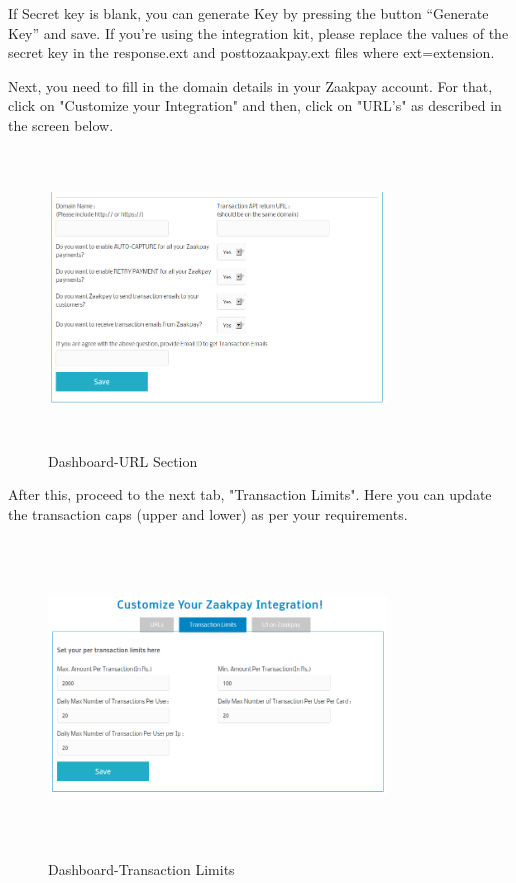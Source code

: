 \documentclass{article}
\begin{document}
If Secret key is blank, you can generate Key by pressing the button “Generate Key” and save. If you're using the integration kit, please replace the values of the secret key in the response.ext and posttozaakpay.ext files where ext=extension.

Next, you need to fill in the domain details in your Zaakpay account. For that, click on "Customize your Integration" and then, click on "URL's" as described in the screen below.

\begin{figure}[H]
\centering
\caption{Dashboard-URL Section}
\includegraphics[width=0.8\textwidth,height=3.1in]{Data_not_complete.png}
\end{figure}

After this, proceed to the next tab, "Transaction Limits". Here you can update the transaction caps (upper and lower) as per your requirements.

\begin{figure}[H]
\centering
\caption{Dashboard-Transaction Limits}
\includegraphics[width=0.8\textwidth,height=3.3in]{Transaction_limits.png}
\end{figure}
\end{document}
